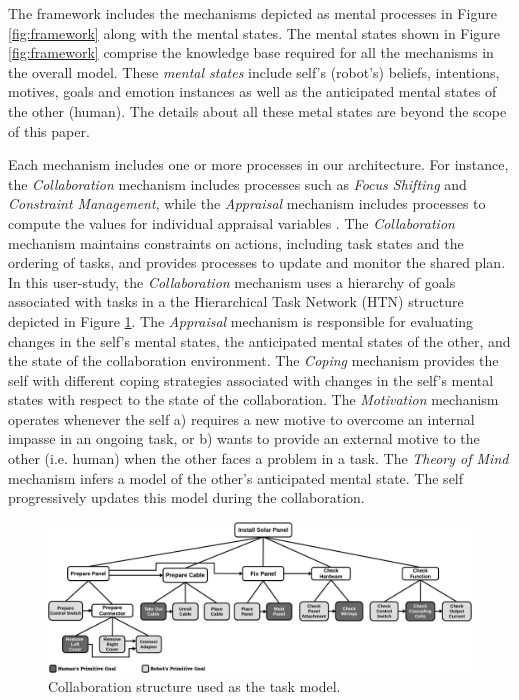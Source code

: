 \documentclass{sig-alternate-05-2015}
\begin{document}
The framework includes the mechanisms depicted as mental processes in Figure
\ref{fig:framework} along with the mental states. The mental
states shown in Figure \ref{fig:framework} comprise the knowledge base required
for all the mechanisms in the overall model. These \textit{mental states}
include self's (robot's) beliefs, intentions, motives, goals and emotion
instances as well as the anticipated mental states of the other (human). The
details about all these metal states are beyond the scope of this paper. 

Each mechanism includes one or more processes in our architecture. For instance,
the \textit{Collaboration} mechanism includes processes such as \textit{Focus
Shifting} and \textit{Constraint Management}, while the \textit{Appraisal}
mechanism includes processes to compute the values for individual appraisal
variables \cite{shayganfar:emotional-awareness}
\cite{shayganfar:appraisal-short}. The \textit{Collaboration} mechanism
maintains constraints on actions, including task states and the ordering of
tasks, and provides processes to update and monitor the shared plan. In this
user-study, the \textit{Collaboration} mechanism uses a hierarchy of goals
associated with tasks in a the Hierarchical Task Network (HTN) structure
depicted in Figure \ref{fig:collaboration_structure}. The \textit{Appraisal}
mechanism is responsible for evaluating changes in the self's mental states, the
anticipated mental states of the other, and the state of the collaboration
environment. The \textit{Coping} mechanism provides the self with different
coping strategies associated with changes in the self's mental states with
respect to the state of the collaboration. The \textit{Motivation} mechanism
operates whenever the self a) requires a new motive to overcome an internal
impasse in an ongoing task, or b) wants to provide an external motive to the
other (i.e. human) when the other faces a problem in a task. The \textit{Theory
of Mind} mechanism infers a model of the other's anticipated mental state. The
self progressively updates this model during the collaboration.

\begin{figure}[tbh]
  \centering
  \includegraphics[width=1\textwidth]{figure/collaborationStructure.pdf}
  \caption{{\fontsize{9}{9}\selectfont Collaboration structure used as the
  task model.}}
  \vspace*{-5mm}
  \label{fig:collaboration_structure}
\end{figure}
\end{document}
